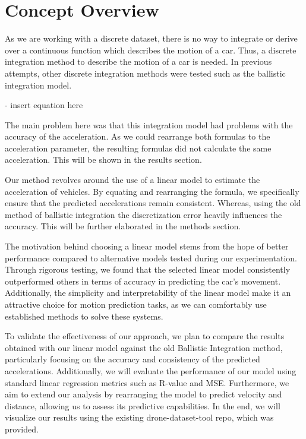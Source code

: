 \section{Concept Overview}
As we are working with a discrete dataset, there is no way to integrate or derive over a continuous function 
which describes the motion of a car. 
Thus, a discrete integration method to describe the motion of a car is needed. 
In previous attempts, other discrete integration methods were tested such as the ballistic integration model.

- insert equation here

The main problem here was that this integration model had problems with the accuracy of the acceleration. 
As we could rearrange both formulas to the acceleration parameter, the resulting formulas did not calculate the 
same acceleration. This will be shown in the results section.

Our method revolves around the use of a linear model to estimate the acceleration of vehicles.
By equating and rearranging the formula, we specifically ensure that the predicted accelerations remain consistent. 
Whereas, using the old method of ballistic integration the discretization error heavily influences the accuracy.
This will be further elaborated in the methods section.

The motivation behind choosing a linear model stems from the hope of better performance compared 
to alternative models tested during our experimentation. 
Through rigorous testing, we found that the selected linear model consistently outperformed others in 
terms of accuracy in predicting the car's movement. 
Additionally, the simplicity and interpretability of the linear model make it an attractive choice for 
motion prediction tasks, as we can comfortably use established methods to solve these systems. 

To validate the effectiveness of our approach, we plan to compare the results obtained with our linear 
model against the old Ballistic Integration method, particularly focusing on the accuracy and consistency of 
the predicted accelerations. 
Additionally, we will evaluate the performance of our model using standard linear regression metrics such as 
R-value and MSE. 
Furthermore, we aim to extend our analysis by rearranging the model to predict velocity and distance, 
allowing us to assess its predictive capabilities.
In the end, we will visualize our results using the existing drone-dataset-tool repo, 
which was provided.


